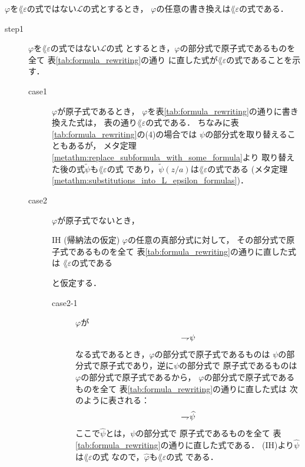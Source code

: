 	\begin{screen}
		\begin{metathm}
		\label{metathm:rewritten_formulas_are_of_L_epsilon}
			$\varphi$を$\lang{\varepsilon}$の式ではない$\mathcal{L}$の式とするとき，
			$\varphi$の任意の書き換えは$\lang{\varepsilon}$の式である．
		\end{metathm}
	\end{screen}
	
	\begin{metaprf}\mbox{}
		\begin{description}
			\item[step1] $\varphi$を$\lang{\varepsilon}$の式ではない$\mathcal{L}$の式
				とするとき，$\varphi$の部分式で原子式であるものを全て
				表\ref{tab:formula_rewriting}の通り
				に直した式が$\lang{\varepsilon}$の式であることを示す．
				\begin{description}
					\item[case1] $\varphi$が原子式であるとき，
						$\varphi$を表\ref{tab:formula_rewriting}の通りに書き換えた式は，
						表の通り$\lang{\varepsilon}$の式である．
						ちなみに表\ref{tab:formula_rewriting}の(4)の場合では
						$\psi$の部分式を取り替えることもあるが，
						メタ定理\ref{metathm:replace_subformula_with_some_formula}より
						取り替えた後の式$\widetilde{\psi}$も$\lang{\varepsilon}$の式
						であり，$\widetilde{\psi}(z/a)$は$\lang{\varepsilon}$の式である
						(メタ定理\ref{metathm:substitutions_into_L_epsilon_formulas})．
						
					\item[case2] $\varphi$が原子式でないとき，
						\begin{itembox}[l]{IH (帰納法の仮定)}
							$\varphi$の任意の真部分式に対して，
							その部分式で原子式であるものを全て
							表\ref{tab:formula_rewriting}の通りに直した式は
							$\lang{\varepsilon}$の式である
						\end{itembox}
						と仮定する．
						\begin{description}
							\item[case2-1] $\varphi$が
								\begin{align}
									\rightharpoondown\hspace{-0.25em} \psi
								\end{align}
								なる式であるとき，$\varphi$の部分式で原子式であるものは
								$\psi$の部分式で原子式であり，逆に$\psi$の部分式で
								原子式であるものは$\varphi$の部分式で原子式であるから，
								$\varphi$の部分式で原子式であるものを全て
								表\ref{tab:formula_rewriting}の通りに直した式は
								次のように表される：
								\begin{align}
									\rightharpoondown\hspace{-0.25em} \widehat{\psi}
								\end{align}
								ここで$\widehat{\psi}$とは，$\psi$の部分式で
								原子式であるものを全て
								表\ref{tab:formula_rewriting}の通りに直した式である．
								(IH)より$\widehat{\psi}$は$\lang{\varepsilon}$の式
								なので，$\widehat{\varphi}$も$\lang{\varepsilon}$の式
								である．
								

\end{description}
\end{description}
\end{description}
\end{metaprf}
